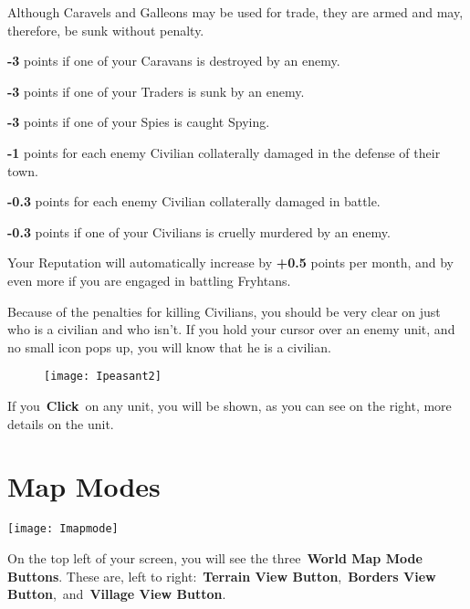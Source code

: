 \begin{adjustwidth}{1cm}{}
Although Caravels and Galleons may be used for trade, they are armed and may, therefore, be sunk without penalty.

\textbf{-3} points if one of your Caravans is destroyed by an enemy.

\textbf{-3} points if one of your Traders is sunk by an enemy.

\textbf{-3} points if one of your Spies is caught Spying.

\textbf{-1} points for each enemy Civilian collaterally damaged in the defense of their town.

\textbf{-0.3} points for each enemy Civilian collaterally damaged in battle.

\textbf{-0.3} points if one of your Civilians is cruelly murdered by an enemy.

Your Reputation will automatically increase by \textbf{+0.5} points per month, and by even more if you are engaged in battling Fryhtans.
\end{adjustwidth}

Because of the penalties for killing Civilians, you should be very clear on just who is a civilian and who isn’t. If you hold your cursor over an enemy unit, and no small icon pops up, you will know that he is a civilian.

\begin{wrapfigure}{r}{0.5\textwidth}
\vspace{-20pt}
	\begin{center}
		\texttt{[image: Ipeasant2]}
\end{center}
\vspace{-20pt}
\end{wrapfigure}

If you \textbf{Click} on any unit, you will be shown, as you can see on the right, more details on the unit.

\clearpage

\section{Map Modes}

\begin{center}
	\texttt{[image: Imapmode]}
\end{center}

On the top left of your screen, you will see the three \textbf{World Map Mode Buttons}. These are, left to right: \textbf{Terrain View Button}, \textbf{Borders View Button}, and \textbf{Village View Button}.

